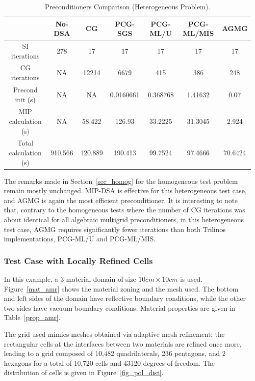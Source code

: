 \documentclass[preprint,10pt]{elsarticle}
\renewcommand{\(}{\left(}
\renewcommand{\)}{\right)}
\renewcommand{\[}{\left[}
\renewcommand{\]}{\right]}
\begin{document}
\begin{table}[!htbp]
  \begin{center}
    \caption{Preconditioners Comparison (Heterogeneous Problem).}
    \begin{tabular}{|c|c|c|c|c|c|c|}
      \hline
      & No-DSA & CG & PCG-SGS & PCG-ML/U & PCG-ML/MIS & AGMG\\
      \hline
      SI iterations & 278     & 17      & 17        & 17       & 17      & 17  \\
      CG iterations & NA      & 12214   & 6679      & 415      & 386     & 248  \\
\hline
   Precond init (s) & NA      & NA      & 0.0160661 & 0.368768 & 1.41632 &0.07  \\
MIP calculation (s) & NA      & 58.422  & 126.93    & 33.2225  & 31.3045 &2.924 \\
Total calculation (s) & 910.566 & 120.889 & 190.413 & 99.7524  & 97.4666 &70.6424 \\      
      \hline
    \end{tabular}
    \label{comparison_hex}
  \end{center}
\end{table}
%
The remarks made in Section~\ref {sec_homog} for the homogeneous test problem
remain mostly unchanged. MIP-DSA is effective for this heterogeneous test case, and AGMG is
again the most efficient preconditioner. It is interesting to note that, contrary to the
homogeneous tests where the number of CG iterations was about identical  for all
algebraic multigrid preconditioners, in this heterogeneous test case, AGMG requires
significantly fewer iterations than both Trilinos implementations, PCG-ML/U and PCG-ML/MIS.

\subsubsection{Test Case with Locally Refined Cells}

In this example, a 3-material domain of size $10cm\times 10cm$ is used. 
Figure~\ref {mat_amr} shows the material zoning and the mesh used. 
The bottom and left sides of the domain have reflective boundary conditions, while the other 
two sides have vacuum boundary conditions. Material properties 
are given in Table~\ref {prop_amr}.

The grid used mimics meshes obtained via adaptive mesh
refinement: the rectangular cells at the interfaces between two materials are refined once more,
leading to a grid composed of 10,482 quadrilaterals, 236 pentagons,
and 2 hexagons for a total of 10,720 cells and 43120 degrees of freedom. 
The distribution of cells is given in Figure~\ref {fig_pol_dist}.
\end{document}
